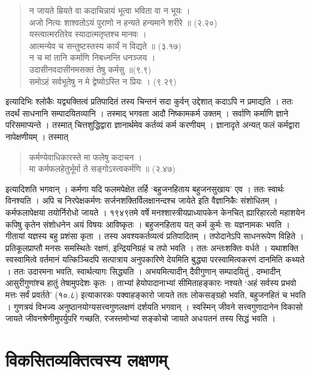 {\begin{verse}
न जायते म्रियते वा कदाचिन्नायं भूत्वा भविता वा न भूयः । \\
अजो नित्यः शाश्वतोऽयं पुराणो न हन्यते हन्यमाने शरीरे ॥ (२.२०) \\
यस्त्वात्मरतिरेव स्यादात्मतृप्तश्च मानवः । \\
आत्मन्येव च सन्तुष्टस्तस्य कार्यं न विद्यते ॥ (३.१७)\\
न च मां तानि कर्माणि निबध्नन्ति धनञ्जय । \\
उदासीनवदासीनमसक्तं तेषु कर्मसु ॥(९.९)\\
समोऽहं सर्वभूतेषु न मे द्वेष्योऽस्ति न प्रियः । (९.२९)
\end{verse}
इत्यादिभिः श्लोकैः यद्व्यक्तित्वं प्रतिपादितं तस्य चिन्तनं सदा कुर्वन् उद्देशात् कदाऽपि न प्रमाद्यति । ततः तदर्थं साधनानि सम्पादयितव्यानि । तस्माद् भगवता आदौ निष्कामकर्म उक्तम् । सर्वाणि कर्माणि ज्ञाने परिसमाप्यन्ते । तस्मात् चित्तशुद्धिद्वारा ज्ञानार्थमेव कर्तव्यं कर्म करणीयम् । ज्ञानादृते अन्यत् फलं कर्मद्वारा नापेक्षणीयम् । तस्मात् 
\begin{verse}
कर्मण्येवाधिकारस्ते मा फलेषु कदाचन । \\
मा कर्मफलहेतुर्भूर्मा ते सङ्गोऽस्त्वकर्मणि ॥ (२.४७)
\end{verse}
इत्यादिशति भगवान् । कर्मणा यदि फलमपेक्षेत तर्हि ‘बहुजनहिताय बहुजनसुखाय' एव । ततः स्वार्थः विनश्यति । अपि च निरपेक्षकर्मणः सर्जनशक्तिर्विलक्षानन्दश्च जायेते इति वैज्ञानिकैः संशोधितम् । कर्मफलापेक्षया तयोर्निरोधो जायते । १९४९तमे वर्षे मनश्शास्त्रीयप्राध्यापकेन केनचित् ह्यारिहारलो महाशयेन कपिषु कृतेन संशोधनेन अयं विषयः आविष्कृतः । बहुजनहिताय यत् कर्म कुर्मः सः यज्ञनामकः भवति । गीतायां यज्ञस्य बहु प्रशंसा कृता । तस्य अवश्यकर्तव्यत्वं प्रतिपादितम् । तपोदानेऽपि साधनरूपेण विहिते । प्रतिकूलप्राप्तौ मनसः समस्थितेः रक्षणं, इन्द्रियनिग्रहं च तपो भवति । ततः अन्तःशक्तिः वर्धते । यथाशक्ति स्वस्वामित्वे वर्तमानं यत्किञ्चिदपि सत्पात्राय अनुपकारिणे देयमिति बुद्ध्या परस्वामित्वकरणं दानमिति कथ्यते । ततः उदारमना भवति, स्वार्थत्यागः सिद्ध्यति । अभयमित्यादीन् दैवीगुणान् सम्पादयितुं , दम्भादीन् आसुरीगुणांश्च हातुं तेषामुपदेशः कृतः । ताभ्यां हेयोपादानाभ्यां सीमिताहङ्कारः नश्यते ‘अहं सर्वस्य प्रभवो मत्तः सर्वं प्रवर्तते' (१०.८) इत्याकारकः पक्वाहङ्कारो जायते ततः लोकसङ्ग्रहो भवति, बहुजनहितं च भवति । गुणत्रयं विभज्य अनुष्ठानयोग्यसत्त्वगुणलक्षणं दर्शयति भगवान् । स्वस्मिन् जीवने सत्त्वगुणादानेन विकासो जायते  जीवनश्रेणीमुपर्युपरि गच्छति, रजस्तमोभ्यां सङ्कोचो जायते अधःपतनं तस्य सिद्धं भवति । 

\section*{विकसितव्यक्तित्वस्य लक्षणम्} 

}
